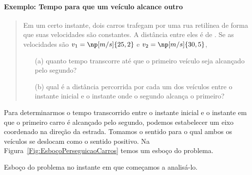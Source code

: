 \paragraph{Exemplo: Tempo para que um veículo alcance outro}

\begin{quote}
	Em um certo instante, dois carros trafegam por uma rua retilínea de forma que suas velocidades são constantes. A distância entre eles é de . Se as velocidades são $v_1 = \np[m/s]{25,2}$ e $v_2 = \np[m/s]{30,5}$,
	\begin{itemize}
		\item[(a)] quanto tempo transcorre até que o primeiro veículo seja alcançado pelo segundo?
		\item[(b)] qual é a distância percorrida por cada um dos veículos entre o instante inicial e o instante onde o segundo alcança o primeiro?
	\end{itemize}
\end{quote}

Para determinarmos o tempo transcorrido entre o instante inicial e o instante em que o primeiro carro é alcançado pelo segundo, podemos estabelecer um eixo coordenado na direção da estrada. Tomamos o sentido para o qual ambos os veículos se deslocam como o sentido positivo. Na Figura~\ref{Fig:EsboçoPerseguicaoCarros} temos um esboço do problema.

\begin{marginfigure}
\centering
{}
\caption{Esboço do problema no instante em que começamos a analisá-lo. \label{Fig:EsboçoPerseguicaoCarros}}
\end{marginfigure}

